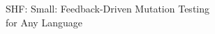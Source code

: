 \documentclass[11pt]{article}
\begin{document}
\begin{center}
  \huge SHF: Small: Feedback-Driven Mutation Testing\\for Any Language
\end{center}















\newpage
\setcounter{page}{1}



\end{document}
